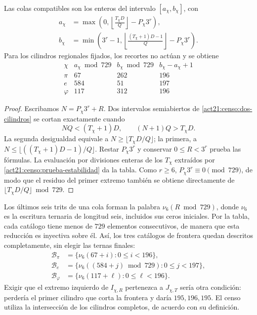 \begin{proposition}
\label{act21:censo:catalogos}
Las colas compatibles son los enteros del intervalo \([a_\chi,b_\chi]\),
con
\begin{align}
 a_\chi&=\max\left(0,
       \left\lfloor\frac{T_\chi D}{Q}\right\rfloor-P_\chi3^r\right),
       \label{act21:censo:extremo-a}\\
 b_\chi&=\min\left(3^r-1,
       \left\lfloor\frac{(T_\chi+1)D-1}{Q}\right\rfloor-P_\chi3^r\right).
       \label{act21:censo:extremo-b}
\end{align}
Para los cilindros regionales fijados, los recortes no actúan y se obtiene
\begin{equation}
\begin{array}{c|r|r|r}
 \chi&a_\chi\bmod729&b_\chi\bmod729&b_\chi-a_\chi+1\\\hline
 \pi&67&262&196\\
 e&584&51&197\\
 \varphi&117&312&196
\end{array}
\label{act21:censo:tabla-catalogos}
\end{equation}
\end{proposition}
\begin{proof}
Escribamos \(N=P_\chi3^r+R\). Dos intervalos semiabiertos de
\eqref{act21:censo:dos-cilindros} se cortan exactamente cuando
\[
 NQ<(T_\chi+1)D,\qquad (N+1)Q>T_\chi D.
\]
La segunda desigualdad equivale a
\(N\geq\lfloor T_\chi D/Q\rfloor\); la primera, a
\(N\leq\lfloor((T_\chi+1)D-1)/Q\rfloor\). Restar
\(P_\chi3^r\) y conservar \(0\leq R<3^r\) prueba las fórmulas.
La evaluación por divisiones enteras de los \(T_\chi\) extraídos por
\eqref{act21:censo:prueba-estabilidad} da la tabla. Como \(r\geq6\),
\(P_\chi3^r\equiv0\pmod{729}\), de modo que el residuo del primer
extremo también se obtiene directamente de
\(\lfloor T_\chi D/Q\rfloor\bmod729\).
\end{proof}

Los últimos seis trits de una cola forman la palabra
\(\nu_6(R\bmod729)\), donde \(\nu_6\) es la escritura ternaria
de longitud seis, incluidos sus ceros iniciales. Por la tabla, cada
catálogo tiene menos de \(729\) elementos consecutivos, de manera que
esta reducción es inyectiva sobre él. Así, los tres catálogos de frontera
quedan descritos completamente, sin elegir las ternas finales:
\begin{equation}
 \begin{split}
 \mathcal B_\pi&=\{\nu_6(67+i):0\leq i<196\},\\
 \mathcal B_e&=\{\nu_6((584+j)\bmod729):0\leq j<197\},\\
 \mathcal B_\varphi&=\{\nu_6(117+\ell):0\leq\ell<196\}.
 \end{split}
 \label{act21:censo:fronteras-explicitas}
\end{equation}
Exigir que el extremo izquierdo de \(I_{\chi,R}\) pertenezca a
\(J_{\chi,T}\) sería otra condición: perdería el primer cilindro
que corta la frontera y daría \(195,196,195\). El censo utiliza la
intersección de los cilindros completos, de acuerdo con su definición.

